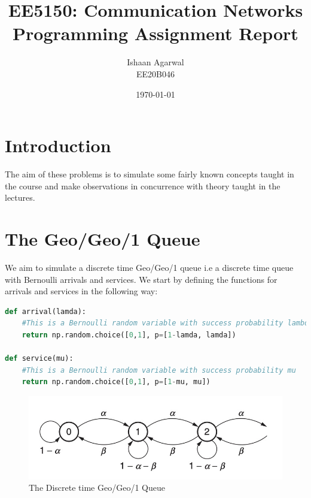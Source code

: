 \documentclass[11pt, a4paper]{article}
\title{EE5150: Communication Networks \\ Programming Assignment Report} %
\author{Ishaan Agarwal \\ EE20B046} %
\date{\today} %
\begin{document}
		
		
\maketitle %

\section{Introduction}
The aim of these problems is to simulate some fairly known concepts taught in the course and make observations in concurrence with theory taught in the lectures.


\section{The Geo/Geo/1 Queue}

We aim to simulate a discrete time Geo/Geo/1 queue i.e a discrete time queue with Bernoulli arrivals and services.
We start by defining the functions for arrivals and services in the following way:
\\

\begin{lstlisting}[language = Python]
def arrival(lamda):
    #This is a Bernoulli random variable with success probability lambda
    return np.random.choice([0,1], p=[1-lamda, lamda])

def service(mu):
    #This is a Bernoulli random variable with success probability mu
    return np.random.choice([0,1], p=[1-mu, mu])
\end{lstlisting}

\begin{figure}[H]
     \centering
     \includegraphics[scale=0.3]{Figure_1.png}
     \caption{The Discrete time Geo/Geo/1 Queue}
\end{figure}
\end{document}
